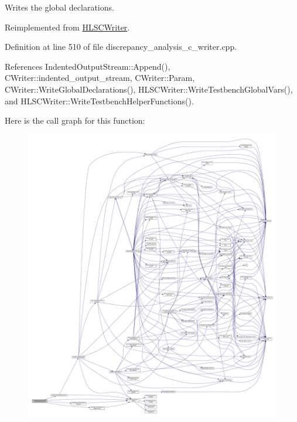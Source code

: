 Writes the global declarations. 



Reimplemented from \hyperlink{classHLSCWriter_a6ea23b34e9d1bde20adbef400db94c6f}{H\+L\+S\+C\+Writer}.



Definition at line 510 of file discrepancy\+\_\+analysis\+\_\+c\+\_\+writer.\+cpp.



References Indented\+Output\+Stream\+::\+Append(), C\+Writer\+::indented\+\_\+output\+\_\+stream, C\+Writer\+::\+Param, C\+Writer\+::\+Write\+Global\+Declarations(), H\+L\+S\+C\+Writer\+::\+Write\+Testbench\+Global\+Vars(), and H\+L\+S\+C\+Writer\+::\+Write\+Testbench\+Helper\+Functions().

Here is the call graph for this function\+:
\nopagebreak
\begin{figure}[H]
\begin{center}
\leavevmode
\includegraphics[width=350pt]{d4/d5c/classDiscrepancyAnalysisCWriter_a33b017d849ad5c03561e0bd2a72a37a9_cgraph}
\end{center}
\end{figure}
\mbox{\label{classDiscrepancyAnalysisCWriter_aab973340021c0338599762a89589a588}} 
